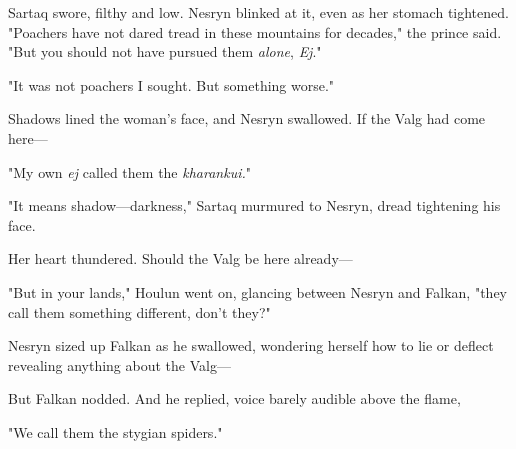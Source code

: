 Sartaq swore, filthy and low.
Nesryn blinked at it, even as her stomach tightened.
"Poachers have not dared tread in these mountains for decades," the prince said.
"But you should not have pursued them \emph{alone}, \emph{Ej}."

"It was not poachers I sought.
But something worse."

Shadows lined the woman's face, and Nesryn swallowed.
If the Valg had come here---

"My own \emph{ej} called them the \emph{kharankui.}"

"It means shadow---darkness," Sartaq murmured to Nesryn, dread tightening his face.

Her heart thundered.
Should the Valg be here already---

"But in your lands," Houlun went on, glancing between Nesryn and Falkan, "they call them something different, don't they?"

Nesryn sized up Falkan as he swallowed, wondering herself how to lie or deflect revealing anything about the Valg---

But Falkan nodded.
And he replied, voice barely audible above the flame,

"We call them the stygian spiders."

